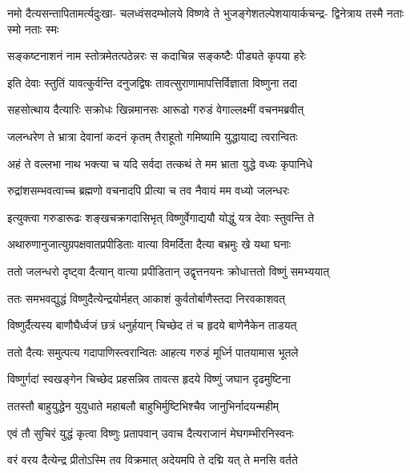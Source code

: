 \fourlineindentedshloka
{नमो दैत्यसन्तापितामर्त्यदुःखा-}
{चलध्वंसदम्भोलये विष्णवे ते}
{भुजङ्गेशतल्पेशयायार्कचन्द्र-}
{द्विनेत्राय तस्मै नताः स्मो नताः स्मः} %


\twolineshloka
{सङ्कष्टनाशनं नाम स्तोत्रमेतत्पठेन्नरः}
{स कदाचिन्न सङ्कष्टैः पीड्यते कृपया हरेः} %

\twolineshloka
{इति देवाः स्तुतिं यावत्कुर्वन्ति दनुजद्विषः}
{तावत्सुराणामापत्तिर्विज्ञाता विष्णुना तदा} %

\twolineshloka
{सहसोत्थाय दैत्यारिः सक्रोधः खिन्नमानसः}
{आरूढो गरुडं वेगाल्लक्ष्मीं वचनमब्रवीत्} %


\twolineshloka
{जलन्धरेण ते भ्रात्रा देवानां कदनं कृतम्}
{तैराहूतो गमिष्यामि युद्धायाद्य त्वरान्वितः} %


\twolineshloka
{अहं ते वल्लभा नाथ भक्त्या च यदि सर्वदा}
{तत्कथं ते मम भ्राता युद्धे वध्यः कृपानिधे} %


\twolineshloka
{रुद्रांशसम्भवत्वाच्च ब्रह्मणो वचनादपि}
{प्रीत्या च तव नैवायं मम वध्यो जलन्धरः} %


\twolineshloka
{इत्युक्त्वा गरुडारूढः शङ्खचक्रगदासिभृत्}
{विष्णुर्वेगाद्ययौ योद्धुं यत्र देवाः स्तुवन्ति ते} %

\twolineshloka
{अथारुणानुजात्युग्रपक्षवातप्रपीडिताः}
{वात्या विमर्दिता दैत्या बभ्रमुः खे यथा घनाः} %

\twolineshloka
{ततो जलन्धरो दृष्ट्वा दैत्यान् वात्या प्रपीडितान्}
{उद्वृत्तनयनः क्रोधात्ततो विष्णुं समभ्ययात्} %

\twolineshloka
{ततः समभवद्युद्धं विष्णुदैत्येन्द्रयोर्महत्}
{आकाशं कुर्वतोर्बाणैस्तदा निरवकाशवत्} %

\twolineshloka
{विष्णुर्दैत्यस्य बाणौघैर्ध्वजं छत्रं धनुर्हयान्}
{चिच्छेद तं च हृदये बाणेनैकेन ताडयत्} %

\twolineshloka
{ततो दैत्यः समुत्पत्य गदापाणिस्त्वरान्वितः}
{आहत्य गरुडं मूर्ध्नि पातयामास भूतले} %

\twolineshloka
{विष्णुर्गदां स्वखङ्गेन चिच्छेद प्रहसन्निव}
{तावत्स हृदये विष्णुं जघान दृढमुष्टिना} %

\twolineshloka
{ततस्तौ बाहुयुद्धेन युयुधाते महाबलौ}
{बाहुभिर्मुष्टिभिश्चैव जानुभिर्नादयन्महीम्} %

\twolineshloka
{एवं तौ सुचिरं युद्धं कृत्वा विष्णुः प्रतापवान्}
{उवाच दैत्यराजानं मेघगम्भीरनिस्वनः} %


\twolineshloka
{वरं वरय दैत्येन्द्र प्रीतोऽस्मि तव विक्रमात्}
{अदेयमपि ते दद्मि यत् ते मनसि वर्तते} %

